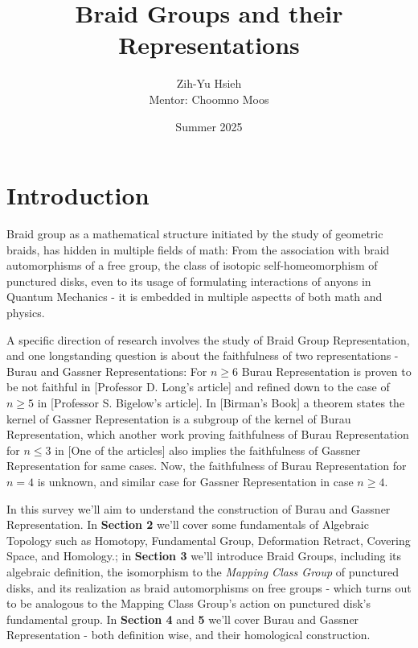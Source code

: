 \documentclass[x11names,reqno,12pt]{extarticle}
\title{Braid Groups and their Representations}
\author{Zih-Yu Hsieh \\ Mentor: Choomno Moos}
\affil{University of California, Santa Barbara \\ College of Creative Studies}
\date{Summer 2025}
\begin{document}
\maketitle
\thispagestyle{firststyle}
\pagestyle{fancy}
\renewcommand{\tilde}{\widetilde}

\tableofcontents

\section{Introduction}
Braid group as a mathematical structure initiated by the study of geometric braids, has hidden in multiple fields of math: From the association with braid automorphisms of a free group, the class of isotopic self-homeomorphism of punctured disks, even to its usage of formulating interactions of anyons in Quantum Mechanics - it is embedded in multiple aspectts of both math and physics.

A specific direction of research involves the study of Braid Group Representation, and one longstanding question is about the faithfulness of two representations - Burau and Gassner Representations: For $n\geq 6$ Burau Representation is proven to be not faithful in [Professor D. Long's article] and refined down to the case of $n\geq 5$ in [Professor S. Bigelow's article]. In [Birman's Book] a theorem states the kernel of Gassner Representation is a subgroup of the kernel of Burau Representation, which another work proving faithfulness of Burau Representation for $n\leq 3$ in [One of the articles] also implies the faithfulness of Gassner Representation for same cases. Now, the faithfulness of Burau Representation for $n=4$ is unknown, and similar case for Gassner Representation in case $n\geq 4$.

In this survey we'll aim to understand the construction of Burau and Gassner Representation. In \textbf{Section 2} we'll cover some fundamentals of Algebraic Topology such as Homotopy, Fundamental Group, Deformation Retract, Covering Space, and Homology.; in \textbf{Section 3} we'll introduce Braid Groups, including its algebraic definition, the isomorphism to the \emph{Mapping Class Group} of punctured disks, and its realization as braid automorphisms on free groups - which turns out to be analogous to the Mapping Class Group's action on punctured disk's fundamental group. In \textbf{Section 4} and \textbf{5} we'll cover Burau and Gassner Representation - both definition wise, and their homological construction.
\end{document}
